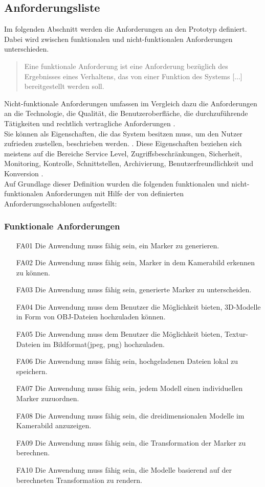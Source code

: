 \subsection{Anforderungsliste}
Im folgenden Abschnitt werden die Anforderungen an den Prototyp definiert. Dabei wird zwischen funktionalen und nicht-funktionalen Anforderungen unterschieden. 
\begin{quote}
\glqq Eine funktionale Anforderung ist eine Anforderung bezüglich des Ergebnisses eines Verhaltens, das von einer Funktion des Systems [...] bereitgestellt werden soll.\grqq \citep[S. 17]{rupp:requirements}
\end{quote}
Nicht-funktionale Anforderungen umfassen im Vergleich dazu die Anforderungen an die Technologie, die Qualität, die Benutzeroberfläche, die durchzuführende Tätigkeiten und rechtlich vertragliche Anforderungen \citep{rupp:requirements}.\\
Sie können als Eigenschaften, die das System besitzen muss, um den Nutzer zufrieden zustellen, beschrieben werden. \citep[S. 10]{robertson:requirements-process}. Diese Eigenschaften beziehen sich meistens auf die Bereiche Service Level, Zugriffsbeschränkungen, Sicherheit, Monitoring, Kontrolle, Schnittstellen, Archivierung, Benutzerfreundlichkeit und Konversion \citep[S. 139]{boehm:systementwicklung}. \\
Auf Grundlage dieser Definition wurden die folgenden funktionalen und nicht-funktionalen Anforderungen mit Hilfe der von \citeauthor[S. 219]{rupp:requirements} definierten Anforderungsschablonen aufgestellt:

\subsubsection{Funktionale Anforderungen}
\begin{itemize}
\item[FA01] Die Anwendung muss fähig sein, ein Marker zu generieren.
\item[FA02] Die Anwendung muss fähig sein, Marker in dem Kamerabild erkennen zu können.
\item[FA03] Die Anwendung muss fähig sein, generierte Marker zu unterscheiden.
\item[FA04] Die Anwendung muss dem Benutzer die Möglichkeit bieten, 3D-Modelle in Form von OBJ-Dateien hochzuladen können.
\item[FA05] Die Anwendung muss dem Benutzer die Möglichkeit bieten, Textur-Dateien im Bildformat(jpeg, png) hochzuladen.
\item[FA06] Die Anwendung muss fähig sein, hochgeladenen Dateien lokal zu speichern.
\item[FA07] Die Anwendung muss fähig sein, jedem Modell einen individuellen Marker zuzuordnen.
\item[FA08] Die Anwendung muss fähig sein, die dreidimensionalen Modelle im Kamerabild anzuzeigen.
\item[FA09] Die Anwendung muss fähig sein, die Transformation der Marker zu berechnen.
\item[FA10] Die Anwendung muss fähig sein, die Modelle basierend auf der berechneten Transformation zu rendern.
\end{itemize}

